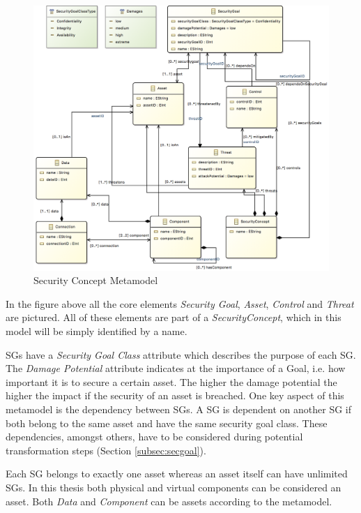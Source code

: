 \begin{figure}[H]
\centering
\includegraphics[width=\textwidth]{pictures/concept_metamodel.png}
\caption{Security Concept Metamodel}
\end{figure}

In the figure above all the core elements \textit{Security Goal}, \textit{Asset}, \textit{Control} and \textit{Threat} are pictured. All of these elements are part of a \textit{SecurityConcept}, which in this model will be simply identified by a name. 

SGs have a \textit{Security Goal Class} attribute which describes the purpose of each SG. The \textit{Damage Potential} attribute indicates at the importance of a Goal, i.e. how important it is to secure a certain asset. The higher the damage potential the higher the impact if the security of an asset is breached. One key aspect of this metamodel is the dependency between SGs. A SG is dependent on another SG if both belong to the same asset and have the same security goal class. These dependencies, amongst others, have to be considered during potential transformation steps (Section \ref{subsec:secgoal}). 

Each SG belongs to exactly one asset whereas an asset itself can have unlimited SGs. In this thesis both physical and virtual components can be considered an asset. Both \textit{Data} and \textit{Component} can be assets according to the metamodel. 

